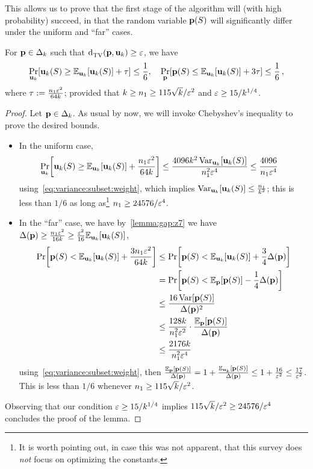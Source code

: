 This allows us to prove that the first stage of the algorithm will (with high probability) succeed, in that the random variable $\mathbf{p}(S)$ will significantly differ under the uniform and ``far'' cases. 
\begin{lemma}
  \label{lemma:empirical:subset:guarantee:pS}
  For $\mathbf{p}\in\Delta_{k}$ such that $\totalvardist{\p}{\uniform_\ab} \geq \dst$, we have
  \[
  \bP{\uniform_\ab}{\uniform_\ab(S) \geq \bE{\uniform_\ab}{\uniform_\ab(S)} + \tau} \leq \frac{1}{6}
  , \quad
  \bP{\p}{\p(S) \leq \bE{\uniform_\ab}{\uniform_\ab(S)} + 3\tau} \leq \frac{1}{6}\,,
  \]
  where $\tau := \frac{n_1\varepsilon^2}{64k}$; provided that $k \geq n_1 \geq 115\sqrt{k}/\varepsilon^2$ and $\varepsilon \geq 15/k^{1/4}$.
\end{lemma}
\begin{proof}
Let $\mathbf{p}\in\Delta_{k}$. As usual by now, we will invoke Chebyshev's inequality to prove the desired bounds.
\begin{itemize}
    \item In the uniform case, 
    \begin{align*}
    \bP{\uniform_\ab}{\uniform_\ab(S) \geq \bE{\uniform_\ab}{\uniform_\ab(S)} + \frac{\nss\dst^2}{64\ab}} 
    &\leq \frac{4096\ab^2\Var_{\uniform_\ab}[\uniform_\ab(S)]}{\nss^2\dst^4} 
    \leq \frac{4096}{\nss\dst^4}
    \end{align*}
    using~\cref{eq:variance:subset:weight}, which implies $\operatorname{Var}_{\mathbf{u}_k}[\mathbf{u}_k(S)] \leq \frac{n_1}{k^2}$; this is less than $1/6$ as long as\footnote{It is worth pointing out, in case this was not apparent, that this survey does \emph{not} focus on optimizing the constants.} $n_1 \geq 24576/\varepsilon^4$.
    \item In the ``far'' case, we have by~\cref{lemma:gap:z7} we have $\Delta(\p) \geq \frac{\nss\dst^2}{16\ab} \geq \frac{\dst^2}{16}\bE{\uniform_\ab}{\uniform_\ab(S)}$, 
    \begin{align*}
        \bPr{\p(S) < \bE{\uniform_\ab}{\uniform_\ab(S)} + \frac{3\nss\dst^2}{64\ab}} 
        &\leq \bPr{\p(S) < \bE{\uniform_\ab}{\uniform_\ab(S)} + \frac{3}{4}\Delta(\p)}\\
        &= \bPr{\p(S) < \bE{\p}{\p(S)} - \frac{1}{4}\Delta(\p)} \\
        &\leq \frac{16\Var[\p(S)]}{\Delta(\p)^2} \\
        &\leq \frac{128\ab}{\nss^2\dst^2}\cdot \frac{\bE{\p}{\p(S)}}{\Delta(\p)} \\
        &\leq \frac{2176\ab}{\nss^2\dst^4} 
    \end{align*}
    using~\cref{eq:variance:subset:weight}, then $\frac{\bE{\p}{\p(S)}}{\Delta(\p)} = 1+\frac{\bE{\uniform_\ab}{\p(S)}}{\Delta(\p)} \leq 1+\frac{16}{\dst^2} \leq \frac{17}{\dst^2}$. This is less than $1/6$ whenever $n_1 \geq 115\sqrt{k}/\varepsilon^2$.
\end{itemize}
Observing that our condition $\varepsilon \geq 15/k^{1/4}$ implies $115\sqrt{k}/\varepsilon^2\geq 24576/\varepsilon^4$ concludes the proof of the lemma.
\end{proof}

